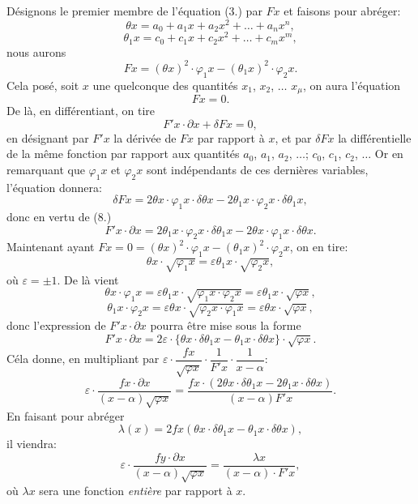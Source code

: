 \documentclass{article}
\begin{document}
Désignons le premier membre de l'équation (3.) par $Fx$ et faisons pour abréger:
\[ \theta x = a_0 + a_1x + a_2x^{2} + \ldots + a_nx^{n}, \tag{5} \]
\[ \theta_1 x = c_0 + c_1x + c_2x^{2} + \ldots + c_mx^{m}, \]
nous aurons
\[ Fx = (\theta x)^{2} \cdot \varphi_1 x - (\theta_1 x)^{2} \cdot \varphi_2 x. \tag{6} \]
Cela posé, soit $x$ une quelconque des quantités $x_1$, $x_2$, $\ldots$ $x_\mu$, on aura l'équation
\[ Fx = 0. \tag{7} \]
De là, en différentiant, on tire
\[ F'x \cdot \partial x + \delta Fx = 0, \tag{8} \]
en désignant par $F'x$ la dérivée de $Fx$ par rapport à $x$, et par $\delta Fx$ la différentielle de la même fonction par rapport aux quantités $a_0$, $a_1$, $a_2$, $\ldots$; $c_0$, $c_1$, $c_2$, $\ldots$ Or en remarquant que $\varphi_1 x$ et $\varphi_2 x$ sont indépendants de ces dernières variables, l'équation donnera:
\[ \delta Fx = 2\theta x \cdot \varphi_1 x \cdot \delta\theta x - 2\theta_1 x \cdot \varphi_2 x \cdot \delta\theta_1 x, \tag{9} \]
donc en vertu de (8.)
\[ F'x \cdot \partial x = 2\theta_1 x \cdot \varphi_2 x \cdot \delta\theta_1 x - 2\theta x \cdot \varphi_1 x \cdot \delta\theta x. \tag{10} \]
Maintenant ayant $Fx = 0 = (\theta x)^{2} \cdot \varphi_1 x - (\theta_1 x)^{2} \cdot \varphi_2 x$, on en tire:
\[ \theta x \cdot \sqrt{\varphi_1 x} = \varepsilon\theta_1 x \cdot \sqrt{\varphi_2 x}, \tag{11} \]
où $\varepsilon = \pm 1$. De là vient
\[ \theta x \cdot \varphi_1 x = \varepsilon\theta_1 x \cdot \sqrt{\varphi_1 x \cdot \varphi_2 x} = \varepsilon\theta_1 x \cdot \sqrt{\varphi x}, \]
\[ \theta_1 x \cdot \varphi_2 x = \varepsilon\theta x \cdot \sqrt{\varphi_2 x \cdot \varphi_1 x} = \varepsilon\theta x \cdot \sqrt{\varphi x}, \]
donc l'expression de $F'x \cdot \partial x$ pourra être mise sous la forme
\[ F'x \cdot \partial x = 2\varepsilon \cdot \{\theta x \cdot \delta\theta_1 x - \theta_1 x \cdot \delta\theta x\} \cdot \sqrt{\varphi x}. \tag{12} \]
Céla donne, en multipliant par $\varepsilon \cdot \dfrac{fx}{\sqrt{\varphi x}} \cdot \dfrac{1}{F'x} \cdot \dfrac{1}{x-\alpha}$:
\[ \varepsilon \cdot \frac{fx \cdot \partial x}{(x-\alpha)\sqrt{\varphi x}} = \frac{fx \cdot (2\theta x \cdot \delta\theta_1 x - 2\theta_1 x \cdot \delta\theta x)}{(x-\alpha)F'x}. \tag{13} \]
En faisant pour abréger
\[ \lambda(x) = 2fx(\theta x \cdot \delta\theta_1 x - \theta_1 x \cdot \delta\theta x), \tag{14'} \]
il viendra:
\[ \varepsilon \cdot \frac{fy \cdot \partial x}{(x-\alpha)\sqrt{\varphi x}} = \frac{\lambda x}{(x-\alpha) \cdot F'x}, \tag{14} \]
où $\lambda x$ sera une fonction \emph{entière} par rapport à $x$.
\end{document}
